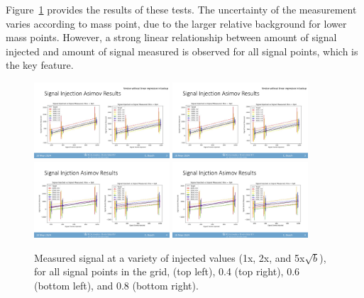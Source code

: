 Figure~\ref{fig:siginj_asimov} provides the results of these tests. 
The uncertainty of the measurement varies according to mass point, due to the larger relative background for lower mass points. 
However, a strong linear relationship between amount of signal injected and amount of signal measured is observed for all signal points, which is the key feature.
\begin{figure}[!htbp]
\centering
   \includegraphics[width=0.45\textwidth]{figures/stats/siginj_asimov_02}
   \includegraphics[width=0.45\textwidth]{figures/stats/siginj_asimov_04}
   \includegraphics[width=0.45\textwidth]{figures/stats/siginj_asimov_06}
   \includegraphics[width=0.45\textwidth]{figures/stats/siginj_asimov_08}
   \caption{Measured signal at a variety of injected values (1x, 2x, and 5x$\sqrt{b}$), for all signal points in the grid,  (top left), 0.4 (top right), 0.6 (bottom left), and 0.8 (bottom right).
    \label{fig:siginj_asimov}}
\end{figure}

